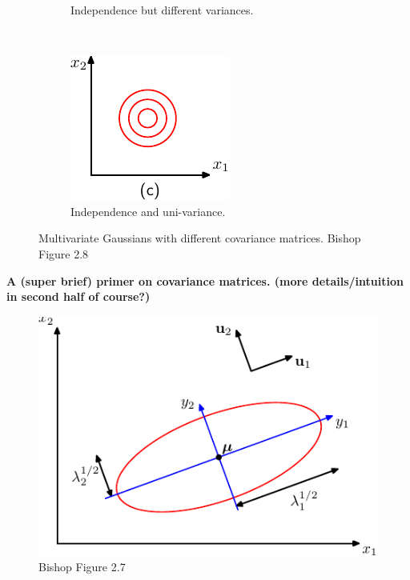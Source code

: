 \begin{figure}
\begin{subfigure}[b]{0.3\textwidth}
		\caption{Independence but different variances.}
	\end{subfigure}
	~
	\begin{subfigure}[b]{0.3\textwidth}
		\includegraphics[width=\textwidth]{./lecture6/Figure28c.pdf}
		\caption{Independence and uni-variance.}
	\end{subfigure}
	\caption{Multivariate Gaussians with different covariance matrices. Bishop Figure 2.8}
\end{figure}

\textbf{A (super brief) primer on covariance matrices. (more details/intuition in second half of course?)} 

\begin{figure}
	\includegraphics[width=.45\textwidth]{./lecture6/Figure27.pdf}
	\caption{Bishop Figure 2.7}
\end{figure}

